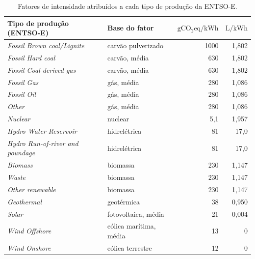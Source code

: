 \begin{table}[htb]
  \centering
  \begin{threeparttable}
    \caption{Fatores de intensidade atribuídos a cada tipo de produção da ENTSO-E.}
    \label{tab:fatores-intensidade}
    \small
    \begin{tabular}{@{}llrr@{}}
      \toprule
      Tipo de produção (ENTSO-E) & Base do fator & $\mathrm{gCO_{2}eq/kWh}$ & $\mathrm{L/kWh}$ \\
      \midrule
      \textit{Fossil Brown coal/Lignite}       & carvão pulverizado\tnote{a}  & 1000 & 1,802 \\
      \textit{Fossil Hard coal}                & carvão, média\tnote{b}       & 630  & 1,802 \\
      \textit{Fossil Coal-derived gas}         & carvão, média\tnote{c}       & 630  & 1,802 \\
      \textit{Fossil Gas}                      & gás, média\tnote{b}          & 280  & 1,086 \\
      \textit{Fossil Oil}                      & gás, média\tnote{d}          & 280  & 1,086 \\
      \textit{Other}                           & gás, média\tnote{e}          & 280  & 1,086 \\
      \textit{Nuclear}                         & nuclear                      & 5,1  & 1,957 \\
      \textit{Hydro Water Reservoir}           & hidrelétrica\tnote{f}        & 81   & 17,0  \\
      \textit{Hydro Run-of-river and poundage} & hidrelétrica\tnote{f}        & 81   & 17,0  \\
      \textit{Biomass}                         & biomassa\tnote{g}            & 230  & 1,147 \\
      \textit{Waste}                           & biomassa\tnote{h}            & 230  & 1,147 \\
      \textit{Other renewable}                 & biomassa\tnote{i}            & 230  & 1,147 \\
      \textit{Geothermal}                      & geotérmica\tnote{g}          & 38   & 0,950 \\
      \textit{Solar}                           & fotovoltaica, média          & 21   & 0,004 \\
      \textit{Wind Offshore}                   & eólica marítima, média       & 13   & 0     \\
      \textit{Wind Onshore}                    & eólica terrestre             & 12   & 0     \\

\end{tabular}
\end{threeparttable}
\end{table}

